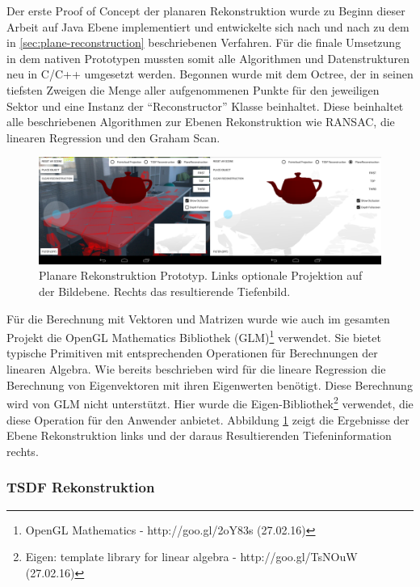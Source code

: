 Der erste Proof of Concept der planaren Rekonstruktion wurde zu Beginn dieser Arbeit auf Java Ebene implementiert und entwickelte sich nach und nach zu dem in \ref{sec:plane-reconstruction} beschriebenen Verfahren. Für die finale Umsetzung in dem nativen Prototypen mussten somit alle Algorithmen und Datenstrukturen neu in C/C++ umgesetzt werden. Begonnen wurde mit dem Octree, der in seinen tiefsten Zweigen die Menge aller aufgenommenen Punkte für den jeweiligen Sektor und eine Instanz der \enquote{Reconstructor} Klasse beinhaltet. Diese beinhaltet alle beschriebenen Algorithmen zur Ebenen Rekonstruktion wie RANSAC, die linearen Regression und den Graham Scan. 

\begin{figure}[h]
  \centering
	\includegraphics[width=1.0\textwidth]{content/images/implementation/plane-demo.png} 
  \caption{Planare Rekonstruktion Prototyp. Links optionale Projektion auf der Bildebene. Rechts das resultierende Tiefenbild.}
  \label{fig:plane-demo}
\end{figure}

Für die Berechnung mit Vektoren und Matrizen wurde wie auch im gesamten Projekt die OpenGL Mathematics Bibliothek (GLM)\footnote{OpenGL Mathematics - http://goo.gl/2oY83s (27.02.16)} verwendet. Sie bietet typische Primitiven mit entsprechenden Operationen für Berechnungen der linearen Algebra. Wie bereits beschrieben wird für die lineare Regression die Berechnung von Eigenvektoren mit ihren Eigenwerten benötigt. Diese Berechnung wird von GLM nicht unterstützt. Hier wurde die Eigen-Bibliothek\footnote{Eigen: template library for linear algebra - http://goo.gl/TsNOuW (27.02.16)} verwendet, die diese Operation für den Anwender anbietet. Abbildung \ref{fig:plane-demo} zeigt die Ergebnisse der Ebene Rekonstruktion links und der daraus Resultierenden Tiefeninformation rechts.


\subsubsection*{TSDF Rekonstruktion}

